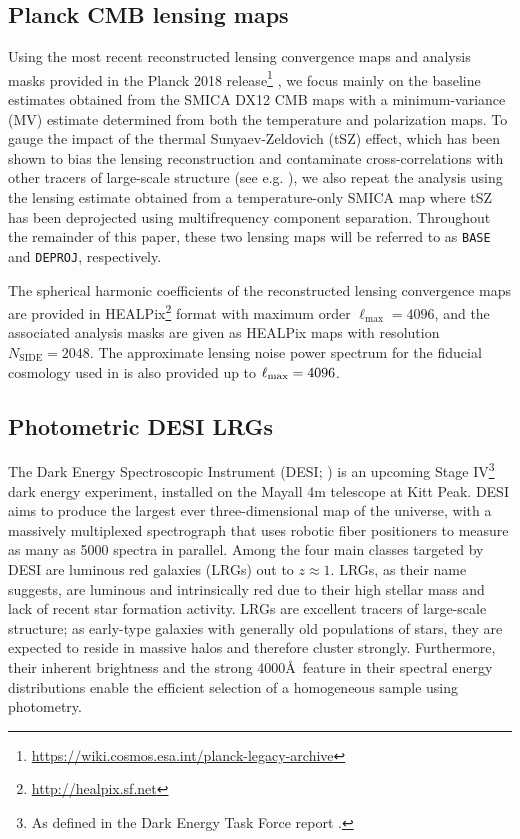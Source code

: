 \subsection{Planck CMB lensing maps}

Using the most recent reconstructed lensing convergence maps and analysis masks provided in the Planck 2018 release\footnote{\url{https://wiki.cosmos.esa.int/planck-legacy-archive}} \citep{PlanckVIII}, we focus mainly on the baseline estimates obtained from the SMICA DX12 CMB maps with a minimum-variance (MV) estimate determined from both the temperature and polarization maps. To gauge the impact of the thermal Sunyaev-Zeldovich (tSZ) effect, which has been shown to bias the lensing reconstruction and contaminate cross-correlations with other tracers of large-scale structure (see e.g. \citealt{Osborne++14, vanEngelen++14, Madhavacheril++18, Schaan++19}), we also repeat the analysis using the lensing estimate obtained from a temperature-only SMICA map where tSZ has been deprojected using multifrequency component separation. Throughout the remainder of this paper, these two lensing maps will be referred to as \texttt{BASE} and \texttt{DEPROJ}, respectively. 

The spherical harmonic coefficients of the reconstructed lensing convergence maps are provided in HEALPix\footnote{\url{http://healpix.sf.net}} \citep{Gorski++05} format with maximum order $\ell_{\text{max}}=4096$, and the associated analysis masks are given as HEALPix maps with resolution $N_{\text{SIDE}} = 2048$. The approximate lensing noise power spectrum for the fiducial cosmology used in \cite{PlanckVIII} is also provided up to $\ell_{\rm max} = 4096$.

\subsection{Photometric DESI LRGs}

The Dark Energy Spectroscopic Instrument (DESI; \citealt{DESI16}) is an upcoming Stage IV\footnote{As defined in the Dark Energy Task Force report \citep{DarkEnergyTaskForce}.} dark energy experiment, installed on the Mayall 4m telescope at Kitt Peak. DESI aims to produce the largest ever three-dimensional map of the universe, with a massively multiplexed spectrograph that uses robotic fiber positioners to measure as many as 5000 spectra in parallel. Among the four main classes targeted by DESI are luminous red galaxies (LRGs) out to $z \approx 1$. LRGs, as their name suggests, are luminous and intrinsically red due to their high stellar mass and lack of recent star formation activity. LRGs are excellent tracers of large-scale structure; as early-type galaxies with generally old populations of stars, they are expected to reside in massive halos and therefore cluster strongly. Furthermore, their inherent brightness and the strong 4000\AA \ feature in their spectral energy distributions enable the efficient selection of a homogeneous sample using photometry.

